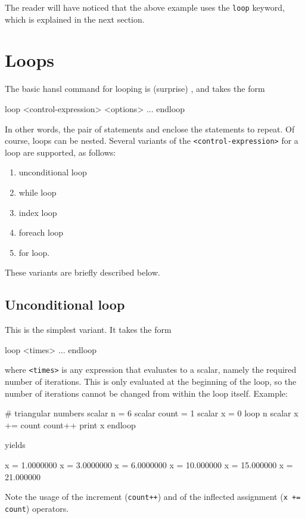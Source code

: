 The reader will have noticed that the above example uses the
\texttt{loop} keyword, which is explained in the next section.

\section{Loops}
\label{sec:hr-loops}

The basic hansl command for looping is (surprise) , and
takes the form
\begin{code}
loop <control-expression> <options>
    ...
endloop
\end{code}
In other words, the pair of statements  and 
enclose the statements to repeat. Of course, loops can be nested.
Several variants of the \texttt{<control-expression>} for a loop are
supported, as follows:
\begin{enumerate}
\item unconditional loop
\item while loop
\item index loop
\item foreach loop
\item for loop.
\end{enumerate}
These variants are briefly described below.

\subsection{Unconditional loop}

This is the simplest variant. It takes the form
\begin{code}
loop <times>
   ...
endloop
\end{code}
where \texttt{<times>} is any expression that evaluates to a scalar,
namely the required number of iterations. This is only evaluated at
the beginning of the loop, so the number of iterations cannot be
changed from within the loop itself. Example:
\begin{code}
# triangular numbers
scalar n = 6
scalar count = 1
scalar x = 0
loop n
    scalar x += count
    count++
    print x
endloop
\end{code}
yields
\begin{code}
              x =  1.0000000
              x =  3.0000000
              x =  6.0000000
              x =  10.000000
              x =  15.000000
              x =  21.000000
\end{code}

Note the usage of the increment (\texttt{count++}) and of the
inflected assignment (\texttt{x += count}) operators.

